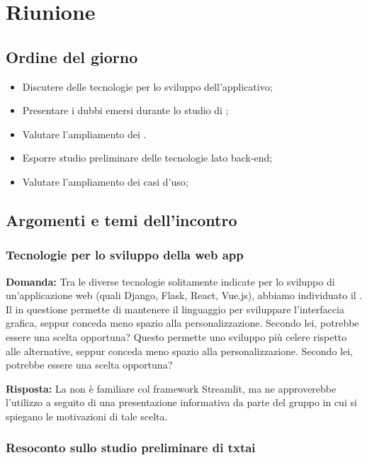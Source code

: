 \section{Riunione}
\subsection{Ordine del giorno}
\begin{itemize}
\item Discutere delle tecnologie per lo sviluppo dell'applicativo;
\item Presentare i dubbi emersi durante lo studio di ;
\item Valutare l'ampliamento dei .
	\item Esporre studio preliminare delle tecnologie lato back-end;
	\item Valutare l'ampliamento dei casi d'uso;
\end{itemize}

\subsection{Argomenti e temi dell'incontro}

\subsubsection{Tecnologie per lo sviluppo della web app}

\textbf{Domanda:} Tra le diverse tecnologie solitamente indicate per lo sviluppo di un'applicazione web (quali Django, Flask, React, Vue.js), abbiamo individuato il  . 
Il  in questione permette di mantenere il linguaggio  per sviluppare l'interfaccia grafica, seppur conceda meno spazio alla personalizzazione. 
Secondo lei, potrebbe essere una scelta opportuna?
Questo permette uno sviluppo  più celere rispetto alle alternative, seppur conceda meno spazio alla personalizzazione. 
Secondo lei, potrebbe essere una scelta opportuna?

\textbf{Risposta:} La  non è familiare col framework Streamlit, ma ne approverebbe l'utilizzo a seguito di una presentazione informativa da parte del gruppo in cui si spiegano le motivazioni di tale scelta.

\subsubsection{Resoconto sullo studio preliminare di txtai}

